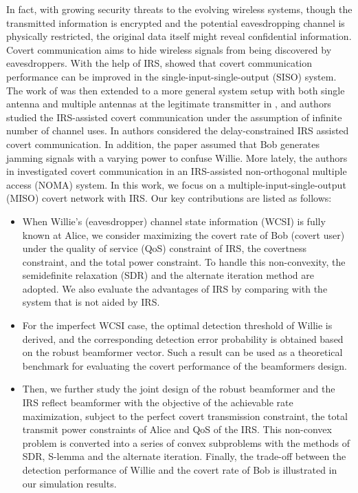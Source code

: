 \documentclass[10pt,journal,letterpaper,twocolumn,twoside]{IEEEtran} %
\begin{document}
In fact, with growing security threats to the evolving wireless systems, though the transmitted
information is encrypted and the potential eavesdropping channel is physically restricted, the original data itself  might reveal confidential information. Covert communication aims to hide wireless signals from being discovered
by eavesdroppers. With the help of IRS,  \cite{Hossain20Intelligent} showed  that
  covert communication performance can be improved in the single-input-single-output (SISO) system.
   The work of \cite{Hossain20Intelligent} was then extended to a more general system setup
with both single antenna and multiple antennas at the legitimate transmitter in \cite{Si21arXiv}, and authors studied  the IRS-assisted covert communication  under the assumption of infinite number of channel uses. In \cite{Zhou20arXiv} authors considered the delay-constrained IRS assisted covert communication. In addition, the paper \cite{Wang21Intelligent} assumed that Bob generates jamming signals with a varying power to confuse Willie. More lately, the authors in \cite{Lv20arXiv} investigated covert communication in an IRS-assisted
non-orthogonal multiple access (NOMA) system.
In this work, we focus on a multiple-input-single-output (MISO) covert network with IRS.
Our key contributions are listed as follows:


\begin{itemize}

\item When
Willie's (eavesdropper)  channel state information (WCSI) is fully known at Alice, we consider maximizing the  covert rate of Bob (covert user)  under the quality of service (QoS) constraint of IRS, the covertness constraint, and the total power constraint.
To handle this non-convexity, the semidefinite relaxation (SDR) and the alternate iteration method are adopted.
We also evaluate the advantages of IRS by comparing with the system that is not aided by IRS.

\item For  the imperfect WCSI case,   the   optimal detection threshold   of Willie is  derived, and the corresponding detection error probability is obtained based on the robust beamformer vector. Such a result can be used  as a theoretical benchmark for evaluating the covert performance of the beamformers design.


\item Then, we further study   the joint  design of the robust beamformer and the IRS reflect beamformer with the objective of the achievable rate maximization,  subject to the perfect covert
transmission constraint, the total transmit power constraints of Alice and QoS of the IRS.
This non-convex problem is converted into a series of convex  subproblems with the methods of SDR,  S-lemma and the alternate iteration. Finally, the trade-off between the detection performance of Willie and the covert rate of Bob is illustrated in our simulation results.

 \end{itemize}
\end{document}
